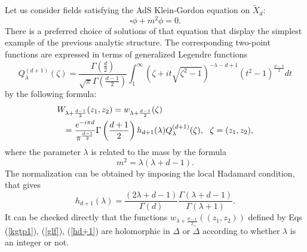 \documentclass[a4paper,a4paper]{article}
\def\wt{\widetilde}
\begin{document}
Let us consider fields satisfying the AdS Klein-Gordon equation on $\widetilde
X_{d}$:
\begin{equation}
\square \phi + m^2 \phi = 0. \label{kg}
\end{equation}
There is a preferred choice of solutions of that equation that display the
simplest example of the previous analytic structure. The corresponding
two-point functions are expressed in terms of generalized Legendre functions
\cite{BV-2}
\begin{equation}
Q^{(d+1)}_{\lambda}(\zeta)= \frac{\Gamma\left(\frac d2\right)}{\sqrt \pi
\Gamma\left(\frac {d-1}{2}\right)}\int_1^\infty (\zeta + it \sqrt{\zeta^2
-1})^{-\lambda-d+1}(t^2-1)^{\frac{d-3}{2}}dt \label{glf}
\end{equation} by the
following formula:
\begin{eqnarray}
\lefteqn{
W_{\lambda + \frac{d-1}{2}}(z_1,z_2) = w_{\lambda + \frac{d-1}{2}}(\zeta)}
\nonumber\\
&&=\frac{e^{-i\pi d}}{\pi^{\frac{d-1}2}} \Gamma\left(\frac{d+1}{2}\right)
h_{d+1}(\lambda) Q^{(d+1)}_{\lambda}(\zeta), \ \ \zeta = (z_1,z_2),
\label{kgtp1}\end{eqnarray}
where the parameter $\lambda$ is related to the mass by the formula
\begin{equation}
m^2=\lambda(\lambda + d-1).
\end{equation}
The normalization can be obtained by imposing the local Hadamard condition,
that gives
\begin{equation}
h_{d+1}(\lambda) = \frac{(2\lambda + d
-1)}{\Gamma(d)}\frac{\Gamma(\lambda + d-1)}{\Gamma(\lambda +1)}.
\label{hd+1}
\end{equation}
It can be checked directly that the functions
$w_{\lambda + \frac{d-1}{2}}((z_1,z_2))$
defined by Eqs (\ref{kgtp1}), (\ref{glf}), (\ref{hd+1})
are holomorphic in $\Delta$ or $\wt\Delta$
according to whether $\lambda$ is an integer or not.
\end{document}
